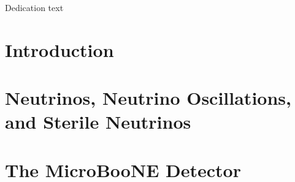 \documentclass[11pt,openright,twoside,letterpaper,onecolumn]{report} %
\begin{document}
\pagestyle{empty}

\thesistitlepage
\thesiscopyrightpage

\thesisabstract


\pagestyle{plain}

\setlength{\footskip}{0.5in}

\setcounter{tocdepth}{2}
\renewcommand{\contentsname}{Table of Contents}
\tableofcontents
\cleardoublepage

\listoffigures
\cleardoublepage


\cleardoublepage

\thispagestyle{plain}
\strut \vfill
\centerline{\LARGE 
Dedication text
}
\vfill \strut
\cleardoublepage


\pagestyle{headings}

%
%
\setlength{\textheight}{8.5in}
\setlength{\footskip}{0in}

 {%
\fancyhf{}
\fancyhead[LE,RO]{\thepage}
\fancyhead[RE,LO]{\itshape \leftmark}
\renewcommand{\headrulewidth}{0pt}
}
\pagestyle{plain}

\chapter{Introduction}
\label{section:intro}


\chapter{Neutrinos, Neutrino Oscillations, and Sterile Neutrinos}
\label{sec:theory}


\chapter{The MicroBooNE Detector}
\label{sec:detector}

\end{document}
